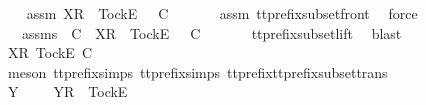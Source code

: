 \ \ \isamarkupfalse%
\ assm{}{\isacharprime}{\isacharcolon}\ {\isachardoublequoteopen}{\isacharbrackleft}X{\isacharbrackright}\isactrlsub R\ {\isacharhash}\ {\isacharbrackleft}Tock{\isacharbrackright}\isactrlsub E\ {\isacharhash}\ {\isasymsigma}{\isacharprime}{\isacharprime}\ {\isasymlesssim}\isactrlsub C\ {\isasymsigma}{\isachardoublequoteclose}\isanewline
\ \ \ \ \isamarkupfalse%
\ assm{}\ tt{\isacharunderscore}prefix{\isacharunderscore}subset{\isacharunderscore}front\ \isamarkupfalse%
\ force\isanewline
\ \ \isamarkupfalse%
\ \isamarkupfalse%
\ {\isasymrho}{\isacharprime}{\isacharprime}\ \ {\isasymrho}{\isacharprime}{\isacharprime}{\isacharunderscore}assms{\isacharcolon}\ {\isachardoublequoteopen}{\isasymrho}{\isacharprime}{\isacharprime}\ {\isasymle}\isactrlsub C\ {\isasymsigma}{\isachardoublequoteclose}\ {\isachardoublequoteopen}{\isacharbrackleft}X{\isacharbrackright}\isactrlsub R\ {\isacharhash}\ {\isacharbrackleft}Tock{\isacharbrackright}\isactrlsub E\ {\isacharhash}\ {\isasymsigma}{\isacharprime}{\isacharprime}\ {\isasymlesssim}\isactrlsub C\ {\isasymrho}{\isacharprime}{\isacharprime}{\isachardoublequoteclose}\isanewline
\ \ \ \ \isamarkupfalse%
\ tt{\isacharunderscore}prefix{\isacharunderscore}subset{\isacharunderscore}lift\ \isamarkupfalse%
\ blast\isanewline
\ \ \isamarkupfalse%
\ \isamarkupfalse%
\ {\isachardoublequoteopen}{\isacharbrackleft}{\isacharbrackleft}X{\isacharbrackright}\isactrlsub R{\isacharcomma}\ {\isacharbrackleft}Tock{\isacharbrackright}\isactrlsub E{\isacharbrackright}\ {\isasymlesssim}\isactrlsub C\ {\isasymrho}{\isacharprime}{\isacharprime}{\isachardoublequoteclose}\isanewline
\ \ \ \ \isamarkupfalse%
\ {\isacharparenleft}meson\ tt{\isacharunderscore}prefix{\isachardot}simps{\isacharparenleft}{}{\isacharparenright}\ tt{\isacharunderscore}prefix{\isachardot}simps{\isacharparenleft}{}{\isacharparenright}\ tt{\isacharunderscore}prefix{\isacharunderscore}tt{\isacharunderscore}prefix{\isacharunderscore}subset{\isacharunderscore}trans{\isacharparenright}\isanewline
\ \ \isamarkupfalse%
\ \isamarkupfalse%
\ Y\ {\isasymrho}{\isacharprime}{\isacharprime}{\isacharprime}\ \ {\isachardoublequoteopen}{\isasymrho}{\isacharprime}{\isacharprime}\ {\isacharequal}\ {\isacharbrackleft}Y{\isacharbrackright}\isactrlsub R\ {\isacharhash}\ {\isacharbrackleft}Tock{\isacharbrackright}\isactrlsub E\ {\isacharhash}\ {\isasymrho}{\isacharprime}{\isacharprime}{\isacharprime}{\isachardoublequoteclose}\isanewline
